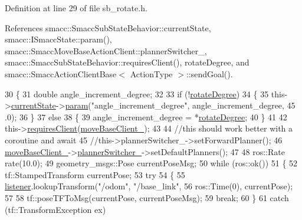 Definition at line 29 of file sb\+\_\+rotate.\+h.



References smacc\+::\+Smacc\+Sub\+State\+Behavior\+::current\+State, smacc\+::\+I\+Smacc\+State\+::param(), smacc\+::\+Smacc\+Move\+Base\+Action\+Client\+::planner\+Switcher\+\_\+, smacc\+::\+Smacc\+Sub\+State\+Behavior\+::requires\+Client(), rotate\+Degree, and smacc\+::\+Smacc\+Action\+Client\+Base$<$ Action\+Type $>$\+::send\+Goal().


\begin{DoxyCode}
30     \{
31         \textcolor{keywordtype}{double} angle\_increment\_degree;
32 
33         \textcolor{keywordflow}{if} (!\hyperlink{classSbRotate_aeaec32fdba434d9482548bda764b0fe0}{rotateDegree})
34         \{
35             this->\hyperlink{classsmacc_1_1SmaccSubStateBehavior_a62e2b9da4a446f09396d0b4c01659b88}{currentState}->\hyperlink{classsmacc_1_1ISmaccState_a4982f2187ed6da337462721146e8ef70}{param}(\textcolor{stringliteral}{"angle\_increment\_degree"}, angle\_increment\_degree, 45
      .0);
36         \}
37         \textcolor{keywordflow}{else}
38         \{
39             angle\_increment\_degree = *\hyperlink{classSbRotate_aeaec32fdba434d9482548bda764b0fe0}{rotateDegree};
40         \}
41         
42         this->\hyperlink{classsmacc_1_1SmaccSubStateBehavior_ae8361a9e794b02f9f3d962b881e4fd7d}{requiresClient}(\hyperlink{classSbRotate_ab6cc0ea1c2e05c0e1ebd57ed6c7d6725}{moveBaseClient\_});
43 
44         \textcolor{comment}{//this should work better with a coroutine and await}
45         \textcolor{comment}{//this->plannerSwitcher\_->setForwardPlanner();}
46         \hyperlink{classSbRotate_ab6cc0ea1c2e05c0e1ebd57ed6c7d6725}{moveBaseClient\_}->\hyperlink{classsmacc_1_1SmaccMoveBaseActionClient_ae24164268108abf0b35cf51bfba5ec67}{plannerSwitcher\_}->setDefaultPlanners();
47 
48         ros::Rate rate(10.0);
49         geometry\_msgs::Pose currentPoseMsg;
50         \textcolor{keywordflow}{while} (ros::ok())
51         \{
52             tf::StampedTransform currentPose;
53             \textcolor{keywordflow}{try}
54             \{
55                 \hyperlink{classSbRotate_a385971c366b3f6e95a0c71870eeca95c}{listener}.lookupTransform(\textcolor{stringliteral}{"/odom"}, \textcolor{stringliteral}{"/base\_link"},
56                                          ros::Time(0), currentPose);
57 
58                 tf::poseTFToMsg(currentPose, currentPoseMsg);
59                 \textcolor{keywordflow}{break};
60             \}
61             \textcolor{keywordflow}{catch} (tf::TransformException ex)

\end{DoxyCode}
